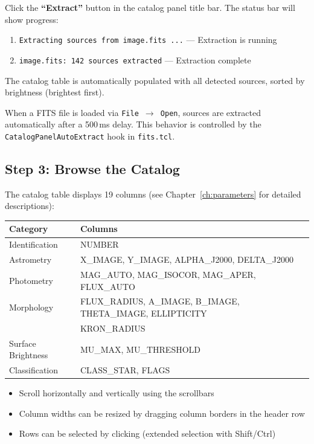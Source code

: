 \documentclass[11pt,fleqn]{book}
\begin{document}
Click the \textbf{``Extract''} button in the catalog panel title bar. The status bar will show progress:
\begin{enumerate}[leftmargin=2em]
  \item \texttt{Extracting sources from image.fits ...} --- Extraction is running
  \item \texttt{image.fits: 142 sources extracted} --- Extraction complete
\end{enumerate}

The catalog table is automatically populated with all detected sources, sorted by brightness (brightest first).

\begin{infobox}
When a FITS file is loaded via \texttt{File $\to$ Open}, sources are extracted automatically after a 500\,ms delay. This behavior is controlled by the \texttt{CatalogPanelAutoExtract} hook in \texttt{fits.tcl}.
\end{infobox}

\subsection{Step 3: Browse the Catalog}

The catalog table displays 19 columns (see Chapter~\ref{ch:parameters} for detailed descriptions):

\begin{center}
\begin{tabular}{ll}
\toprule
\textbf{Category} & \textbf{Columns} \\
\midrule
Identification & NUMBER \\
Astrometry & X\_IMAGE, Y\_IMAGE, ALPHA\_J2000, DELTA\_J2000 \\
Photometry & MAG\_AUTO, MAG\_ISOCOR, MAG\_APER, FLUX\_AUTO \\
Morphology & FLUX\_RADIUS, A\_IMAGE, B\_IMAGE, THETA\_IMAGE, ELLIPTICITY \\
 & KRON\_RADIUS \\
Surface Brightness & MU\_MAX, MU\_THRESHOLD \\
Classification & CLASS\_STAR, FLAGS \\
\bottomrule
\end{tabular}
\end{center}

\begin{itemize}[leftmargin=2em]
  \item Scroll horizontally and vertically using the scrollbars
  \item Column widths can be resized by dragging column borders in the header row
  \item Rows can be selected by clicking (extended selection with Shift/Ctrl)
\end{itemize}
\end{document}
